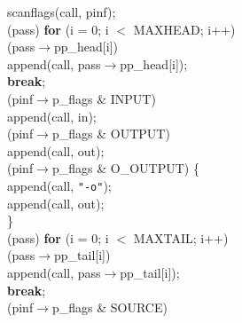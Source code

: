 \begin{flushleft}
\hspace*{3\indentation}scanflags(call, pinf);\mbox{}\\
\hspace*{3\indentation}{\bf if} (pass) {\bf for} (i = 0; i $<$ MAXHEAD; i++)\mbox{}\\
\hspace*{6\indentation}{\bf if} (pass$\rightarrow$pp\_head[i])\mbox{}\\
\hspace*{9\indentation}append(call, pass$\rightarrow$pp\_head[i]);\mbox{}\\
\hspace*{6\indentation}{\bf else}  {\bf break};\mbox{}\\
\hspace*{3\indentation}{\bf if} (pinf$\rightarrow$p\_flags \& INPUT)\mbox{}\\
\hspace*{6\indentation}append(call, in);\mbox{}\\
\hspace*{3\indentation}{\bf if} (pinf$\rightarrow$p\_flags \& OUTPUT)\mbox{}\\
\hspace*{6\indentation}append(call, out);\mbox{}\\
\hspace*{3\indentation}{\bf if} (pinf$\rightarrow$p\_flags \& O\_OUTPUT) \{\mbox{}\\
\hspace*{6\indentation}append(call, {\tt"-o"});\mbox{}\\
\hspace*{6\indentation}append(call, out);\mbox{}\\
\hspace*{3\indentation}\}\mbox{}\\
\hspace*{3\indentation}{\bf if} (pass) {\bf for} (i = 0; i $<$ MAXTAIL; i++)\mbox{}\\
\hspace*{6\indentation}{\bf if} (pass$\rightarrow$pp\_tail[i])\mbox{}\\
\hspace*{9\indentation}append(call, pass$\rightarrow$pp\_tail[i]);\mbox{}\\
\hspace*{6\indentation}{\bf else}  {\bf break};\mbox{}\\
\hspace*{3\indentation}{\bf if} (pinf$\rightarrow$p\_flags \& SOURCE)\mbox{}\\

\end{flushleft}
